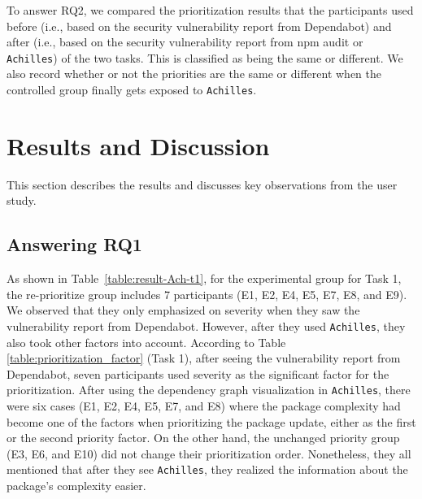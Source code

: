 \documentclass[conference]{IEEEtran}
\newcommand{\boxedtext}[1]{\fbox{\scriptsize\bfseries\textsf{#1}}}
\newcommand{\nota}[2]{
	\boxedtext{#1}
	{\small$\blacktriangleright$\emph{\textsl{#2}}$\blacktriangleleft$}
}
\newcommand{\todo}[1]{{\color{red}\nota{TODO}{#1}}}
\begin{document}
 To answer RQ2, we compared the prioritization results that the participants used before (i.e., based on the security vulnerability report from Dependabot) and after (i.e., based on the security vulnerability report from npm audit or \texttt{Achilles}) of the two tasks. 
 This is classified as being the same or different.
 We also record whether or not the priorities are the same or different when the controlled group finally gets exposed to \texttt{Achilles}.
	
	
	\section{Results and Discussion}
	This section describes the results and discusses key observations from the user study.
	
	\subsection{Answering RQ1}
	
	
	As shown in Table~\ref{table:result-Ach-t1}, for the experimental group for Task 1, the re-prioritize group includes 7 participants (E1, E2, E4, E5, E7, E8, and E9). We observed that they only emphasized on severity when they saw the vulnerability report from Dependabot. However, after they used \texttt{Achilles}, they also took other factors into account. 
	According to Table \ref{table:prioritization_factor} (Task 1), after seeing the vulnerability report from Dependabot, seven participants used severity as the significant factor for the prioritization. After using the dependency graph visualization in \texttt{Achilles}, there were six cases (E1, E2, E4, E5, E7, and E8) where the package complexity had become one of the factors when prioritizing the package update, either as the first or the second priority factor.
	On the other hand, the unchanged priority group (E3, E6, and E10) did not change their prioritization order. Nonetheless, they all mentioned that after they see \texttt{Achilles}, they realized the information about the package's complexity easier.
	
\end{document}
